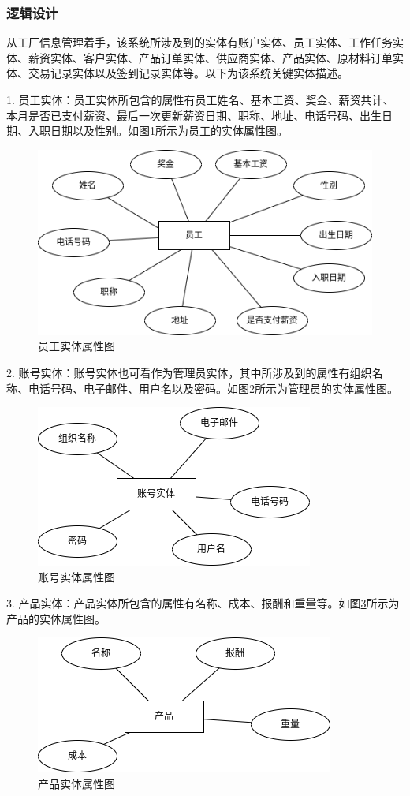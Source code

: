 \subsubsection{逻辑设计}

从工厂信息管理着手，该系统所涉及到的实体有账户实体、员工实体、工作任务实体、薪资实体、客户实体、产品订单实体、供应商实体、产品实体、原材料订单实体、交易记录实体以及签到记录实体等。以下为该系统关键实体描述。

1. 员工实体：员工实体所包含的属性有员工姓名、基本工资、奖金、薪资共计、本月是否已支付薪资、最后一次更新薪资日期、职称、地址、电话号码、出生日期、入职日期以及性别。如图\ref{fig:4emplyerf}所示为员工的实体属性图。

\begin{figure}[H]
    \centering
    \includegraphics[width=.65\textwidth]{figures/4emplyerf.png}
    \caption{员工实体属性图}
    \label{fig:4emplyerf}
\end{figure}

2. 账号实体：账号实体也可看作为管理员实体，其中所涉及到的属性有组织名称、电话号码、电子邮件、用户名以及密码。如图\ref{fig:4acterf}所示为管理员的实体属性图。

\begin{figure}[H]
    \centering
    \includegraphics[width=.45\textwidth]{figures/4acterf.png}
    \caption{账号实体属性图}
    \label{fig:4acterf}
\end{figure}

3. 产品实体：产品实体所包含的属性有名称、成本、报酬和重量等。如图\ref{fig:4prdcterf}所示为产品的实体属性图。

\begin{figure}[H]
    \centering
    \includegraphics[width=.45\textwidth]{figures/4prdcterf.png}
    \caption{产品实体属性图}
    \label{fig:4prdcterf}
\end{figure}

